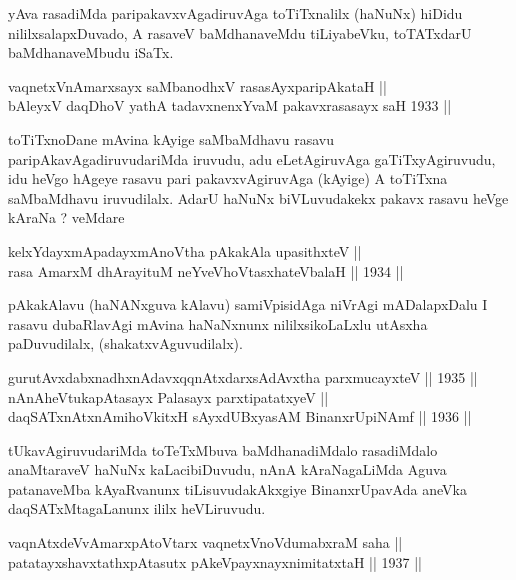\begin{artha}
yAva rasadiMda paripakavxvAgadiruvAga toTiTxnalilx (haNuNx) hiDidu
nililxsalapxDuvado, A rasaveV baMdhanaveMdu tiLiyabeVku, toTATxdarU
baMdhanaveMbudu iSaTx.
\end{artha}

\begin{shl}
vaqnetxVnA\s \s marxsayx saMbanodhxV rasasAyx\s \s paripAkataH || \\
bAleyxV daqDhoV yathA tadavxnenxYvaM pakavxrasasayx saH 1933 ||  
\end{shl}

\begin{artha}
toTiTxnoDane mAvina kAyige saMbaMdhavu rasavu
paripAkavAgadiruvudariMda iruvudu, adu eLetAgiruvAga gaTiTxyAgiruvudu,
idu heVgo hAgeye rasavu pari pakavxvAgiruvAga (kAyige) A toTiTxna
saMbaMdhavu iruvudilalx. AdarU haNuNx biVLuvudakekx pakavx rasavu heVge kAraNa ? veMdare 
\end{artha}

\begin{shl}
kelxYdayxmApadayxmAnoV\s tha pAkakAla upasithxteV || \\
rasa AmarxM dhArayituM neYveVhoVtasxhateV\s balaH \hfill || 1934 ||
  
\end{shl}

\begin{artha}
pAkakAlavu (haNANxguva kAlavu) samiVpisidAga niVrAgi mADalapxDalu I
rasavu dubaRlavAgi mAvina haNaNxnunx nililxsikoLaLxlu utAsxha
paDuvudilalx, (shakatxvAguvudilalx).
\end{artha}

\begin{shl}
gurutAvxdabxnadhxnAdavxqqnAtxdarxsAdAvx\s tha parxmucayxteV \hfill || 1935 ||\\
nAnAheVtukapAtasayx Palasayx parxtipatatxyeV ||  \\
daqSATxnAtxnAmihoVkitxH sAyxdUBxyasAM BinanxrUpiNAmf \hfill || 1936 ||
  
\end{shl}

\begin{artha}
tUkavAgiruvudariMda toTeTxMbuva baMdhanadiMdalo rasadiMdalo
anaMtaraveV haNuNx kaLacibiDuvudu, nAnA kAraNagaLiMda Aguva
patanaveMba kAyaRvanunx tiLisuvudakAkxgiye BinanxrUpavAda aneVka
daqSATxMtagaLanunx ililx heVLiruvudu.
\end{artha}

\begin{shl}
vaqnAtxdeVvA\s \s marxpAtoV\s tarx vaqnetxVnoVdumabxraM saha ||  \\
patatayxshavxtathxpAtasutx pAkeV\s payxnayxnimitatxtaH \hfill || 1937 ||
  
\end{shl}

